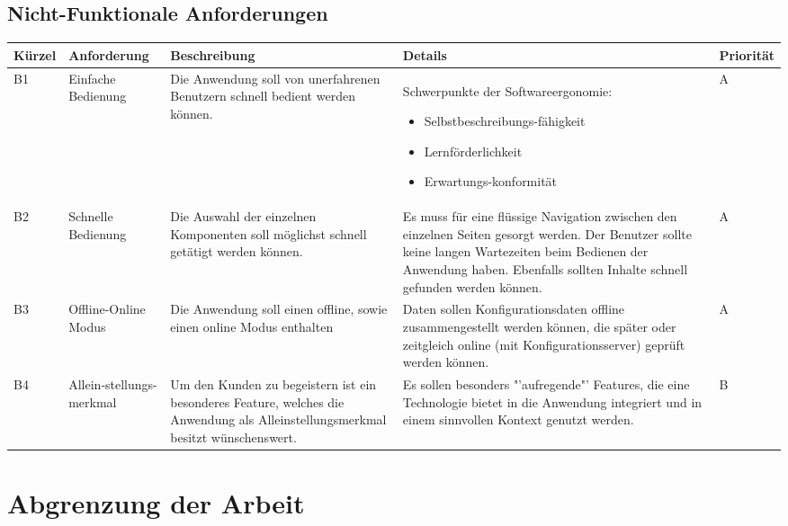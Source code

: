 \subsection{Nicht-Funktionale Anforderungen}
\begin{tabular}{| p{1.1cm} | p{2.2cm} | p{4.3cm} | p{4.9cm} | p{1.3cm} |}
\toprule[2pt] \rowcolor{dunkelgrau}
\hline
  Kürzel & Anforderung & Beschreibung & Details & Priorität \\
  \hline
  B1 & Einfache \newline Bedienung & Die Anwendung soll von unerfahrenen Benutzern schnell bedient werden können.& Schwerpunkte der Softwareergonomie\cite{bib:softwareErgonomie}: 
  \begin{itemize}
        \item Selbstbeschreibungs-fähigkeit
        \item Lernförderlichkeit
        \item Erwartungs-konformität
     \end{itemize}
   & A \\
  \hline
  B2 & Schnelle Bedienung & Die Auswahl der einzelnen Komponenten soll möglichst schnell getätigt werden können. & Es muss für eine flüssige Navigation zwischen den einzelnen Seiten gesorgt werden. Der Benutzer sollte keine langen Wartezeiten beim Bedienen der Anwendung haben. Ebenfalls sollten Inhalte schnell gefunden werden können. & A \\
  \hline
    B3 & Offline-Online Modus & Die Anwendung soll einen offline, sowie einen online Modus enthalten & Daten sollen Konfigurationsdaten offline zusammengestellt werden können, die später oder zeitgleich online (mit Konfigurationsserver) geprüft werden können. & A \\
    \hline
    B4 & Allein-stellungs-merkmal & Um den Kunden zu begeistern ist ein besonderes Feature, welches die Anwendung als Alleinstellungsmerkmal besitzt wünschenswert.& Es sollen besonders "'aufregende"' Features, die eine Technologie bietet in die Anwendung integriert und in einem sinnvollen Kontext genutzt werden.  & B\\
    \hline
\bottomrule[2pt]
\end{tabular}

\section{Abgrenzung der Arbeit}





